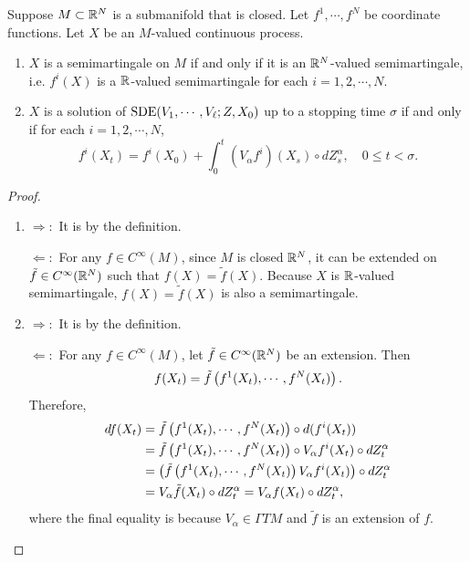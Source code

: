 \begin{prop}
    Suppose $M \subset \mathbb{R}^N$ is a submanifold that is closed. Let $f^1,\cdots,f^N$ be coordinate functions. Let $X$ be an $M$-valued continuous process.
    \begin{enumerate}[label=(\arabic{*})]
        \item $X$ is a semimartingale on $M$ if and only if it is an $\mathbb{R}^N$-valued semimartingale, i.e. $f^i(X)$ is a $\mathbb{R}$-valued semimartingale for each $i = 1,2,\cdots,N$.

        \item $X$ is a solution of $\operatorname{SDE}(V_1,\cdots,V_\ell;Z,X_0)$ up to a stopping time $\sigma$ if and only if for each $i = 1,2,\cdots,N$,
        \begin{equation*}
            f^i(X_t) = f^i(X_0) + \int_0^t (V_\alpha f^i)(X_s) \circ dZ_s^\alpha,\quad 0\leq t < \sigma.
        \end{equation*}
    \end{enumerate}
\end{prop}
\begin{proof}
    \begin{enumerate}[label=(\arabic{*})]
        \item $\Rightarrow:$ It is by the definition.

        $\Leftarrow:$ For any $f \in C^\infty(M)$, since $M$ is closed $\mathbb{R}^N$, it can be extended on $\tilde{f} \in C^\infty(\mathbb{R}^N)$ such that $f(X) = \tilde{f}(X)$. Because $X$ is $\mathbb{R}$-valued semimartingale, $f(X) = \tilde{f}(X)$ is also a semimartingale.

        \item $\Rightarrow:$ It is by the definition.

        $\Leftarrow:$ For any $f \in C^\infty(M)$, let $\tilde{f} \in C^\infty(\mathbb{R}^N)$ be an extension. Then
        \begin{equation*}
            f(X_t) = \tilde{f}\left(f^1(X_t),\cdots,f^N(X_t)\right).
        \end{equation*}
        Therefore,
        \begin{align*}
            df(X_t) &= \tilde{f}\left(f^1(X_t),\cdots,f^N(X_t)\right) \circ d(f^i(X_t)) \\
            &= \tilde{f}\left(f^1(X_t),\cdots,f^N(X_t)\right) \circ V_\alpha f^i(X_t) \circ dZ_t^\alpha \\
            &= \left(\tilde{f}\left(f^1(X_t),\cdots,f^N(X_t)\right)V_\alpha f^i(X_t)\right) \circ dZ_t^\alpha \\
            &= V_{\alpha} \tilde{f}(X_t) \circ dZ^\alpha_t = V_{\alpha} f(X_t) \circ dZ^\alpha_t,
        \end{align*}
        where the final equality is because $V_\alpha \in \Gamma{TM}$ and $\tilde{f}$ is an extension of $f$. \qedhere
    \end{enumerate}
\end{proof}
